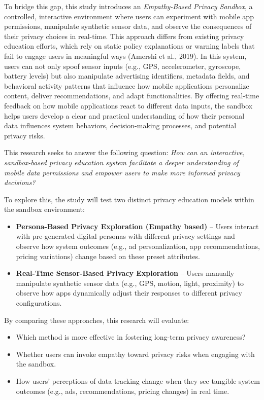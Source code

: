 \documentclass[acmlarge, nonacm]{acmart}
\begin{document}
To bridge this gap, this study introduces an \textit{Empathy-Based Privacy Sandbox}, a controlled, interactive environment where users can experiment with mobile app permissions, manipulate synthetic sensor data, and observe the consequences of their privacy choices in real-time. This approach differs from existing privacy education efforts, which rely on static policy explanations or warning labels that fail to engage users in meaningful ways (Amershi et al., 2019). In this system, users can not only spoof sensor inputs (e.g., GPS, accelerometer, gyroscope, battery levels) but also manipulate advertising identifiers, metadata fields, and behavioral activity patterns that influence how mobile applications personalize content, deliver recommendations, and adapt functionalities. By offering real-time feedback on how mobile applications react to different data inputs, the sandbox helps users develop a clear and practical understanding of how their personal data influences system behaviors, decision-making processes, and potential privacy risks.

This research seeks to answer the following question:
\textit{How can an interactive, sandbox-based privacy education system facilitate a deeper understanding of mobile data permissions and empower users to make more informed privacy decisions?}

To explore this, the study will test two distinct privacy education models within the sandbox environment:
\begin{itemize}
    \item \textbf{Persona-Based Privacy Exploration (Empathy based)} – Users interact with pre-generated digital personas with different privacy settings and observe how system outcomes (e.g., ad personalization, app recommendations, pricing variations) change based on these preset attributes.
    \item \textbf{Real-Time Sensor-Based Privacy Exploration} – Users manually manipulate synthetic sensor data (e.g., GPS, motion, light, proximity) to observe how apps dynamically adjust their responses to different privacy configurations.
\end{itemize}

By comparing these approaches, this research will evaluate:
\begin{itemize}
    \item Which method is more effective in fostering long-term privacy awareness?
    \item Whether users can invoke empathy toward privacy risks when engaging with the sandbox.
    \item How users’ perceptions of data tracking change when they see tangible system outcomes (e.g., ads, recommendations, pricing changes) in real time.
\end{itemize}
\end{document}
